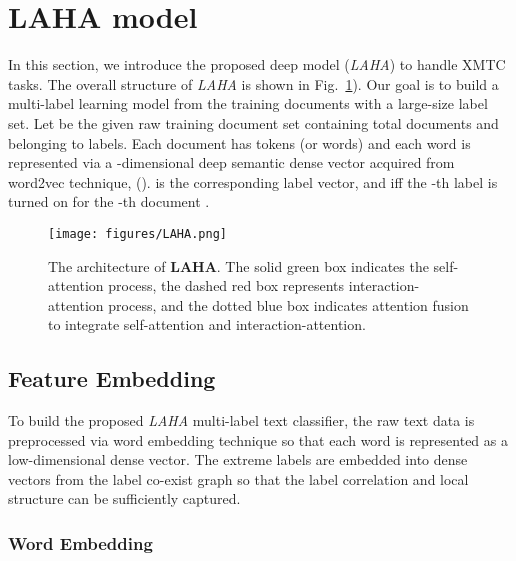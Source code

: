 \documentclass[runningheads]{llncs}
\begin{document}
\vspace{-4mm}
\section{LAHA model}

In this section, we introduce the proposed deep model (\textit{LAHA}) to handle XMTC tasks. The overall structure of \textit{LAHA} is shown in Fig.~\ref{Fig:LAHA}).
Our goal is to build a multi-label learning model from the training documents with a large-size label set. 
Let  be the given raw training document set containing total  documents and belonging to  labels. Each document has  tokens (or words) and each word is represented via a -dimensional deep semantic dense vector acquired from word2vec technique,  ().  is the corresponding label vector, and  iff the -th label is turned on for the -th document . 





\begin{figure}[!h]\centering
	\texttt{[image: figures/LAHA.png]}	
	\setlength{\abovecaptionskip}{0.cm}
	\setlength{\belowcaptionskip}{-0.cm}
	\caption{The architecture of \textbf{LAHA}. The solid green box indicates the self-attention process, the dashed red box represents interaction-attention process, and the dotted blue box indicates attention fusion to integrate self-attention and interaction-attention.} \label{Fig:LAHA}
\end{figure} 




\vspace{-2mm}
\subsection{Feature Embedding}

To build the proposed \textit{LAHA} multi-label text classifier, the raw text data is preprocessed via word embedding technique so that each word is represented as a low-dimensional dense vector. The extreme labels are embedded into dense vectors from the label co-exist graph so that the label correlation and local structure can be sufficiently captured.
\vspace{-2mm}
\subsubsection{Word Embedding} 
\end{document}
